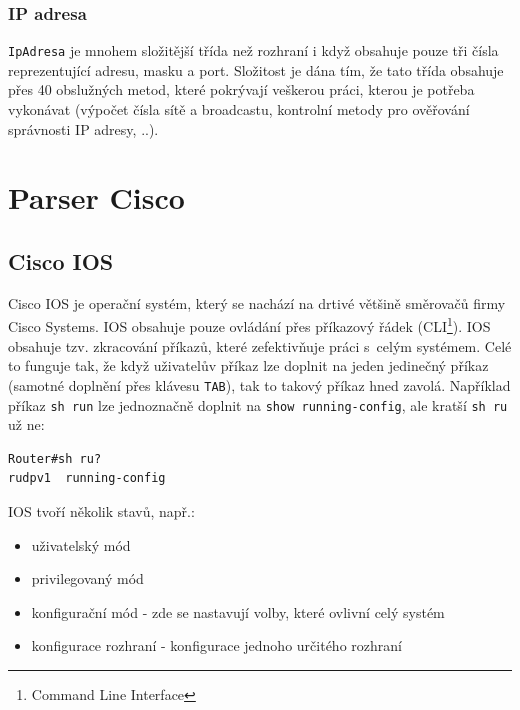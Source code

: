 \newpage

\subsubsection{IP adresa}
\verb|IpAdresa| je mnohem složitější třída než rozhraní i když obsahuje pouze tři čísla reprezentující adresu, masku a port. Složitost je dána tím, že tato třída obsahuje přes 40 obslužných metod, které pokrývají veškerou práci, kterou je potřeba vykonávat (výpočet čísla sítě a broadcastu, kontrolní metody pro ověřování správnosti IP adresy, ..).


\section{Parser Cisco}

\subsection{Cisco IOS}
Cisco IOS je operační systém, který se nachází na drtivé většině směrovačů firmy Cisco Systems. IOS obsahuje pouze ovládání přes příkazový řádek (CLI\footnote{Command Line Interface}). IOS obsahuje tzv. zkracování příkazů, které zefektivňuje práci s~celým systémem. Celé to funguje tak, že když uživatelův příkaz lze doplnit na jeden jedinečný příkaz (samotné doplnění přes klávesu \verb|TAB|), tak to takový příkaz hned zavolá. Například příkaz \verb|sh run| lze jednoznačně doplnit na \verb|show running-config|, ale kratší \verb|sh ru| už ne:
\begin{verbatim}
Router#sh ru?
rudpv1  running-config
\end{verbatim} 

IOS tvoří několik stavů, např.:
\begin{itemize}
 \item uživatelský mód
 \item privilegovaný mód
 \item konfigurační mód - zde se nastavují volby, které ovlivní celý systém
 \item konfigurace rozhraní - konfigurace jednoho určitého rozhraní
\end{itemize}

